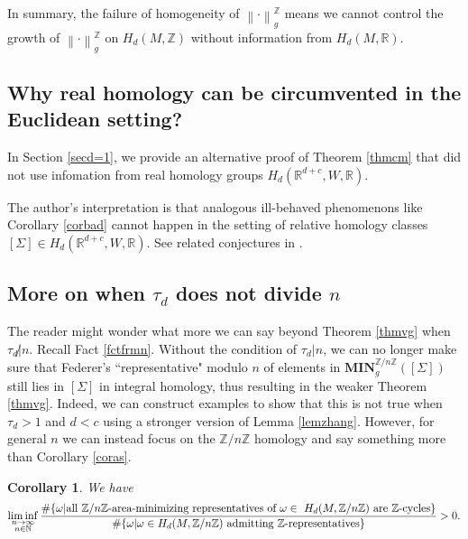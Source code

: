 \documentclass[11pt,a4paper]{amsart}
\numberwithin{equation}{section}
\newcommand{\mn}{\mathbf{MIN}}
\newcommand{\om}{\omega}
\newcommand{\Si}{\Sigma}
\newcommand{\no}[1]{\left\lVert#1\right\rVert}
\newcommand{\N}{\mathbb{N}}
\newcommand{\R}{\mathbb{R}}
\newcommand{\Z}{\mathbb{Z}}
\theoremstyle{plain}
\newtheorem{cor}{Corollary}[subsection]
\theoremstyle{definition}
\numberwithin{equation}{subsection}
\begin{document}
	In summary, the failure of homogeneity of $\no{\cdot}_{g}^{\Z}$ means we cannot control the growth of $\no{\cdot}_{g}^{\Z}$ on $H_d(M,\Z)$ without information from $H_d(M,\R)$. 
	\subsection{Why real homology can be circumvented in the Euclidean setting?}
	In Section \ref{secd=1}, we provide an alternative proof of Theorem \ref{thmcm} that did not use infomation from real homology groups $H_d(\R^{d+c},W,\R)$.
	
The author's interpretation is that analogous ill-behaved phenomenons like Corollary \ref{corbad}	cannot happen in the setting of relative homology classes  $[\Si]\in H_d(\R^{d+c},W,\R).$ See related conjectures in \cite{RY}. \subsection{More on when $\tau_d$ does not divide $n$}
	The reader might wonder what more we can say beyond Theorem \ref{thmvg} when $\tau_d\not|n$. Recall Fact \ref{fctfrmn}. Without the condition of $\tau_d|n$, we can no longer make sure that Federer's ``representative" modulo $n$ of elements in $\mn_g^{\Z/n\Z}\left([\Si]\right)$ still lies in $[\Si]$ in integral homology, thus resulting in the weaker Theorem \ref{thmvg}. Indeed, we can construct examples to show that this is not true when $\tau_d>1$ and $d<c$ using a stronger version of Lemma \ref{lemzhang}. However, for general $n$ we can instead focus on the $\Z/n\Z$ homology and say something more than Corollary \ref{coras}.
	\begin{cor}We have
		\begin{align}\label{eqliminf}
			\liminf_{\substack{n\to\infty\\ n\in\N}}\frac{\#\{\om|\textnormal{all $\Z/n\Z$-area-minimizing representatives of }\om\in  H_d(M,\Z/n\Z)\textnormal{ are $\Z$-cycles}\}}{\#\{\om|\om\in H_d(M,\Z/n\Z)\textnormal{ admitting $\Z$-representatives}\}}>0.
		\end{align}
	\end{cor}
\end{document}
